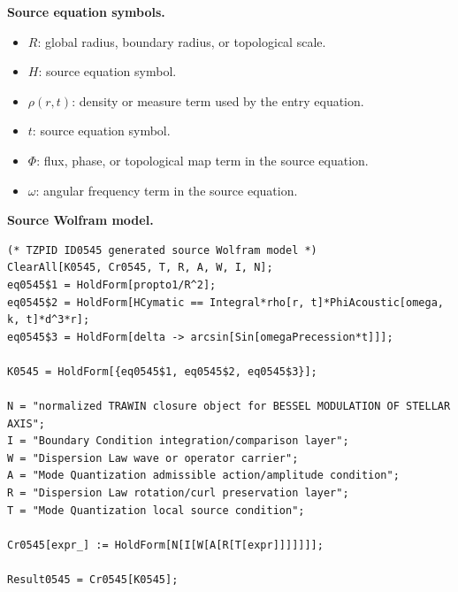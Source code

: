 \begin{minipage}[t]{0.49\linewidth}
\begingroup
\small
\raggedright
\textbf{Source equation symbols.}\par
\begin{itemize}[leftmargin=1.35em,itemsep=1pt,topsep=1pt,parsep=0pt]
    \item $R$: global radius, boundary radius, or topological scale.
    \item $H$: source equation symbol.
    \item $\rho(r,t)$: density or measure term used by the entry equation.
    \item $t$: source equation symbol.
    \item $\Phi$: flux, phase, or topological map term in the source equation.
    \item $\omega$: angular frequency term in the source equation.
\end{itemize}
\endgroup
\end{minipage}\hfill
\begin{minipage}[t]{0.47\linewidth}
\begingroup
\scriptsize
\raggedright
\textbf{Source Wolfram model.}\par
\begin{Verbatim}[fontsize=\tiny,breaklines=true,breakanywhere=true]
(* TZPID ID0545 generated source Wolfram model *)
ClearAll[K0545, Cr0545, T, R, A, W, I, N];
eq0545$1 = HoldForm[propto1/R^2];
eq0545$2 = HoldForm[HCymatic == Integral*rho[r, t]*PhiAcoustic[omega, k, t]*d^3*r];
eq0545$3 = HoldForm[delta -> arcsin[Sin[omegaPrecession*t]]];

K0545 = HoldForm[{eq0545$1, eq0545$2, eq0545$3}];

N = "normalized TRAWIN closure object for BESSEL MODULATION OF STELLAR AXIS";
I = "Boundary Condition integration/comparison layer";
W = "Dispersion Law wave or operator carrier";
A = "Mode Quantization admissible action/amplitude condition";
R = "Dispersion Law rotation/curl preservation layer";
T = "Mode Quantization local source condition";

Cr0545[expr_] := HoldForm[N[I[W[A[R[T[expr]]]]]]];

Result0545 = Cr0545[K0545];
\end{Verbatim}
\endgroup
\end{minipage}

